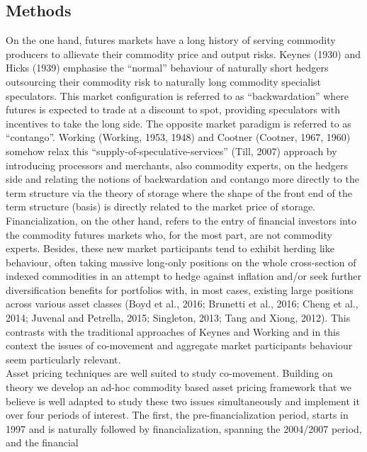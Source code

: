 \documentclass[]{elsarticle} %
\begin{document}
\hypertarget{methods}{%
\subsection{Methods}\label{methods}}

On the one hand, futures markets have a long history of serving
commodity producers to allievate their commodity price and output risks.
Keynes (1930) and Hicks (1939) emphasise the ``normal'' behaviour of
naturally short hedgers outsourcing their commodity risk to naturally
long commodity specialist speculators. This market configuration is
referred to as ``backwardation'' where futures is expected to trade at a
discount to spot, providing speculators with incentives to take the long
side. The opposite market paradigm is referred to as ``contango''.
Working (Working, 1953, 1948) and Cootner (Cootner, 1967, 1960) somehow
relax this ``supply-of-speculative-services'' (Till, 2007) approach by
introducing processors and merchants, also commodity experts, on the
hedgers side and relating the notions of backwardation and contango more
directly to the term structure via the theory of storage where the shape
of the front end of the term structure (basis) is directly related to
the market price of storage.\\
Financialization, on the other hand, refers to the entry of financial
investors into the commodity futures markets who, for the most part, are
not commodity experts. Besides, these new market participants tend to
exhibit herding like behaviour, often taking massive long-only positions
on the whole cross-section of indexed commodities in an attempt to hedge
against inflation and/or seek further diversification benefits for
portfolios with, in most cases, existing large positions across various
asset classes (Boyd et al., 2016; Brunetti et al., 2016; Cheng et al.,
2014; Juvenal and Petrella, 2015; Singleton, 2013; Tang and Xiong,
2012). This contrasts with the traditional approaches of Keynes and
Working and in this context the issues of co-movement and aggregate
market participants behaviour seem particularly relevant.\\
Asset pricing techniques are well suited to study co-movement. Building
on theory we develop an ad-hoc commodity based asset pricing framework
that we believe is well adapted to study these two issues simultaneously
and implement it over four periods of interest. The first, the
pre-financialization period, starts in 1997 and is naturally followed by
financialization, spanning the 2004/2007 period, and the financial
\end{document}
